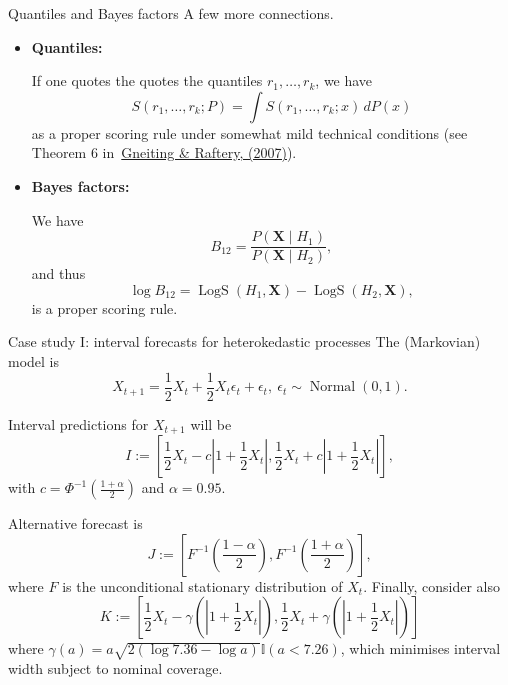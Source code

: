 \begin{frame}{Quantiles and Bayes factors}
A few more connections.

\begin{itemize}
 \item \textbf{Quantiles:}

 If one quotes the quotes the quantiles $r_1, \ldots, r_k$, we have
\begin{equation*}
 S(r_1, \ldots, r_k; P) = \int S(r_1, \ldots, r_k; x)\,dP(x)
\end{equation*}
as a proper scoring rule under somewhat mild technical conditions (see Theorem 6 in~\href{https://sites.stat.washington.edu/raftery/Research/PDF/Gneiting2007jasa.pdf}{Gneiting \& Raftery, (2007)}). 
  \item \textbf{Bayes factors:}
 
 We have
 $$B_{12} = \frac{P(\boldsymbol{X} \mid H_1)}{P(\boldsymbol{X} \mid H_2)},$$
 and thus 
 $$\log B_{12} = \operatorname{LogS}(H_1, \boldsymbol{X}) - \operatorname{LogS}(H_2, \boldsymbol{X}), $$
 is a proper scoring rule.
\end{itemize}
\end{frame}
\begin{frame}{Case study I: interval forecasts for heterokedastic processes}
 The (Markovian) model is
 \[X_{t+1} = \frac{1}{2}X_t + \frac{1}{2}X_t \epsilon_t + \epsilon_t,\: \epsilon_t \sim \operatorname{Normal}(0, 1).  \]
 
 Interval predictions for $X_{t+1}$ will be
 \begin{equation}
  I := \left[\frac{1}{2}X_t - c \left|1 + \frac{1}{2}X_t\right|,  \frac{1}{2}X_t + c \left|1 + \frac{1}{2}X_t\right| \right],
 \end{equation}
with $c = \Phi^{-1}( \frac{1 + \alpha}{2})$ and $\alpha = 0.95$.

Alternative forecast is 
\begin{equation}
 J := \left[F^{-1}\left(\frac{1 - \alpha}{2}\right), F^{-1}\left(\frac{1 + \alpha}{2}\right) \right],
\end{equation}
where $F$ is the unconditional stationary distribution of $X_t$.
Finally, consider also 
\begin{equation}
  K := \left[\frac{1}{2}X_t - \gamma\left(\left|1 + \frac{1}{2}X_t\right|\right),  \frac{1}{2}X_t + \gamma\left(\left|1 + \frac{1}{2}X_t\right|\right) \right]
\end{equation}
where $\gamma(a) = a\sqrt{2\left(\log 7.36 - \log a\right)} \mathbb{I}(a < 7.26)$, which minimises interval width subject to nominal coverage.
\end{frame}
